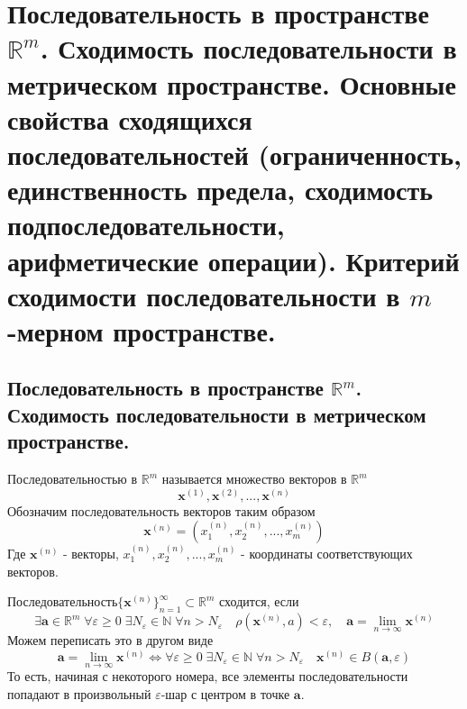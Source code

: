 \section{Последовательность в пространстве $\mathbb {R}^m$. Сходимость последовательности в метрическом пространстве. Основные свойства сходящихся последовательностей (ограниченность, единственность предела, сходимость подпоследовательности, арифметические операции). Критерий сходимости последовательности в $m$-мерном пространстве.}
\subsection{Последовательность в пространстве $\mathbb {R}^m$. Сходимость последовательности в метрическом пространстве.}
Последовательностью в $\mathbb {R}^m$ называется множество векторов в $\mathbb {R}^m$
$$
\textbf{x}^{(1)}, \textbf{x}^{(2)}, ..., \textbf{x}^{(n)}
$$
Обозначим последовательность векторов таким образом 
$$ \textbf{x}^{(n)} = (x^{(n)}_1, x^{(n)}_2, ..., x^{(n)}_m)$$
Где $\textbf{x}^{(n)}$ - векторы, $x^{(n)}_1, x^{(n)}_2, ..., x^{(n)}_m$ - координаты соответствующих векторов.

Последовательность$\{\textbf{x}^{(n)}\}^{\infty}_{n=1} \subset \mathbb {R}^m$ сходится, если 
$$
\exists \textbf {a} \in \mathbb {R}^m \; \forall \varepsilon \geq 0 \; \exists N_{\varepsilon} \in \mathbb {N} \; \forall n > N_{\varepsilon} \quad \rho(\textbf{x}^{(n)}, a) < {\varepsilon}, \quad \textbf {a} = \lim_{n\to\infty}{\textbf{x}^{(n)}}
$$
Можем переписать это в другом виде 
$$
\textbf {a} = \lim_{n\to\infty}{\textbf{x}^{(n)}} \Leftrightarrow \forall \varepsilon \geq 0 \; \exists N_{\varepsilon} \in \mathbb {N} \; \forall n > N_{\varepsilon} \quad \textbf{x}^{(n)} \in B(\textbf {a}, \varepsilon)
$$
То есть, начиная с некоторого номера, все элементы последовательности попадают в произвольный $\varepsilon$-шар с центром в точке $\textbf {a}$.
